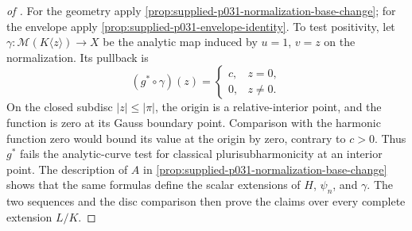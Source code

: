 \begin{proof}[of ]
For the geometry apply \cref{prop:supplied-p031-normalization-base-change}; for the envelope apply \cref{prop:supplied-p031-envelope-identity}. To test positivity, let $\gamma:\mathcal M(K\langle z\rangle)\to X$ be the analytic map induced by $u=1$, $v=z$ on the normalization. Its pullback is
\[
 (g^*\circ\gamma)(z)=
 \begin{cases}
 c,&z=0,\\
 0,&z\neq0.
 \end{cases}
\]
On the closed subdisc $|z|\leq|\pi|$, the origin is a relative-interior point, and the function is zero at its Gauss boundary point. Comparison with the harmonic function zero would bound its value at the origin by zero, contrary to $c>0$. Thus $g^*$ fails the analytic-curve test for classical plurisubharmonicity at an interior point. The description of $A$ in \cref{prop:supplied-p031-normalization-base-change} shows that the same formulas define the scalar extensions of $H$, $\psi_n$, and $\gamma$. The two sequences and the disc comparison then prove the claims over every complete extension $L/K$.
\end{proof}
